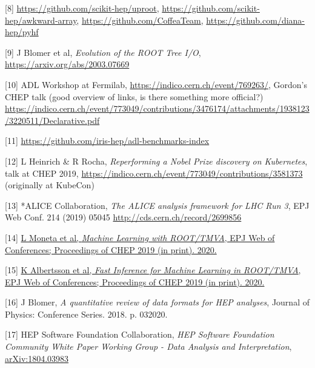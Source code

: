 \documentclass[11pt,a4paper]{article}
\begin{document}
{[}8{]}
\href{https://github.com/scikit-hep/uproot}{{https://github.com/scikit-hep/uproot}},
\href{https://github.com/scikit-hep/awkward-array}{{https://github.com/scikit-hep/awkward-array}},
\href{https://github.com/CoffeaTeam}{{https://github.com/CoffeaTeam}},
\href{https://github.com/diana-hep/pyhf}{{https://github.com/diana-hep/pyhf}}

{[}9{]} J Blomer et al, \emph{Evolution of the ROOT Tree I/O},
\href{https://arxiv.org/abs/2003.07669}{{https://arxiv.org/abs/2003.07669}}

{[}10{]} ADL Workshop at Fermilab,
\href{https://indico.cern.ch/event/769263/timetable/?view=standard}{{https://indico.cern.ch/event/769263/}},
Gordon's CHEP talk (good overview of links, is there something more
official?)
\href{https://indico.cern.ch/event/773049/contributions/3476174/attachments/1938123/3220511/Declarative.pdf}{{https://indico.cern.ch/event/773049/contributions/3476174/attachments/1938123/3220511/Declarative.pdf}}

{[}11{]}
\href{https://github.com/iris-hep/adl-benchmarks-index}{{https://github.com/iris-hep/adl-benchmarks-index}}

{[}12{]} L Heinrich \& R Rocha, \emph{Reperforming a Nobel Prize
discovery on Kubernetes}, talk at CHEP 2019,
\href{https://indico.cern.ch/event/773049/contributions/3581373}{{https://indico.cern.ch/event/773049/contributions/3581373}}
(originally at KubeCon)

{[}13{]} *ALICE Collaboration, \emph{The ALICE analysis framework for
LHC Run 3}, EPJ Web Conf. 214 (2019) 05045
\href{http://cds.cern.ch/record/2699856}{{http://cds.cern.ch/record/2699856}}

{[}14{]} \href{http://paperpile.com/b/2mqsuS/IDej}{L Moneta et al,
\emph{Machine Learning with ROOT/TMVA}, EPJ Web of Conferences;
Proceedings of CHEP 2019 (in print). 2020.}

{[}15{]} \href{http://paperpile.com/b/2mqsuS/6uIv}{K Albertsson et al,
\emph{Fast Inference for Machine Learning in ROOT/TMVA}, EPJ Web of
Conferences; Proceedings of CHEP 2019 (in print). 2020.}

{[}16{]} J Blomer, \emph{A quantitative review of data formats for HEP
analyses}, Journal of Physics: Conference Series. 2018. p. 032020.

{[}17{]} HEP Software Foundation Collaboration, \emph{HEP Software
Foundation Community White Paper Working Group - Data Analysis and
Interpretation},
\href{https://arxiv.org/abs/1804.03983}{{arXiv:1804.03983}}
\end{document}
